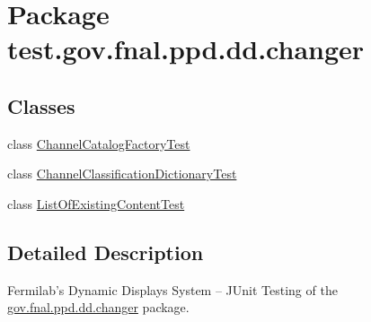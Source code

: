 \hypertarget{namespacetest_1_1gov_1_1fnal_1_1ppd_1_1dd_1_1changer}{\section{Package test.\-gov.\-fnal.\-ppd.\-dd.\-changer}
\label{namespacetest_1_1gov_1_1fnal_1_1ppd_1_1dd_1_1changer}
}
\subsection*{Classes}
\begin{DoxyCompactItemize}
\item 
class \hyperlink{classtest_1_1gov_1_1fnal_1_1ppd_1_1dd_1_1changer_1_1ChannelCatalogFactoryTest}{Channel\-Catalog\-Factory\-Test}
\item 
class \hyperlink{classtest_1_1gov_1_1fnal_1_1ppd_1_1dd_1_1changer_1_1ChannelClassificationDictionaryTest}{Channel\-Classification\-Dictionary\-Test}
\item 
class \hyperlink{classtest_1_1gov_1_1fnal_1_1ppd_1_1dd_1_1changer_1_1ListOfExistingContentTest}{List\-Of\-Existing\-Content\-Test}
\end{DoxyCompactItemize}


\subsection{Detailed Description}
Fermilab's Dynamic Displays System -- J\-Unit Testing of the \hyperlink{namespacetest_1_1gov_1_1fnal_1_1ppd_1_1dd_1_1changer}{gov.\-fnal.\-ppd.\-dd.\-changer} package.